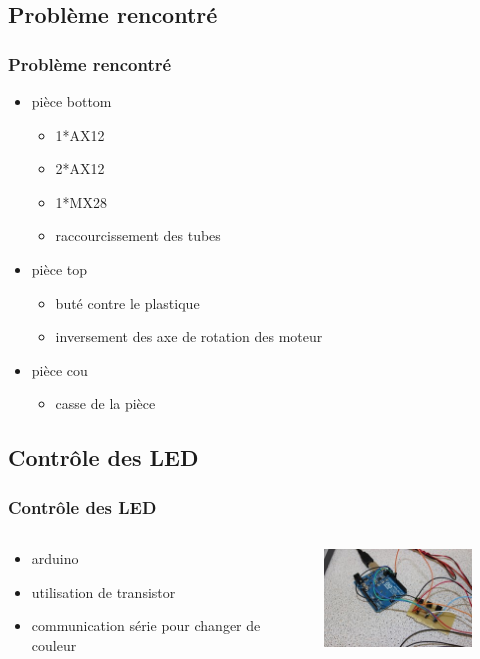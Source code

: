\subsection{Problème rencontré}
\begin{frame}
  \frametitle{Problème rencontré}
  \begin{itemize}
    \item pièce bottom 
      \begin{itemize}
        \item 1*AX12
        \item 2*AX12 
        \item 1*MX28
        \item raccourcissement des tubes
      \end{itemize}
    \item pièce top
      \begin{itemize}
        \item buté contre le plastique
        \item inversement des axe de rotation des moteur
      \end{itemize}
    \item pièce cou
      \begin{itemize}
        \item casse de la pièce
      \end{itemize}
  \end{itemize}
\end{frame}

\subsection{Contrôle des LED}
\begin{frame}
  \frametitle{Contrôle des LED}
  \begin{columns}[c]
    \begin{column}[T]{0.5\textwidth}
      \begin{itemize}
        \item arduino
        \item utilisation de transistor
        \item communication série pour changer de couleur
      \end{itemize}
    \end{column}
    \begin{column}[T]{0.5\textwidth}
      \begin{figure}
        \includegraphics[width=5cm]{../img/arduino+transistorcard.JPG}
      \end{figure}
    \end{column}
  \end{columns}
\end{frame}
